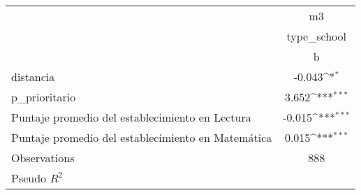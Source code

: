 {
\def\sym#1{\ifmmode^{#1}\else\(^{#1}\)\fi}
\begin{tabular}{l*{1}{c}}
\toprule
                &       m3         \\
                &type\_school         \\
                &        b         \\
\midrule
distancia       &   -0.043\sym{*}  \\
p\_prioritario   &    3.652\sym{***}\\
Puntaje promedio del establecimiento en Lectura&   -0.015\sym{***}\\
Puntaje promedio del establecimiento en Matemática&    0.015\sym{***}\\
\midrule
Observations    &      888         \\
Pseudo \(R^{2}\)&                  \\
\bottomrule
\end{tabular}
}
